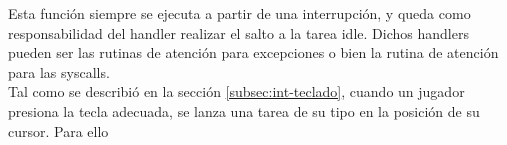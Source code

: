 Esta función siempre se ejecuta a partir de una interrupción, y queda como responsabilidad del handler realizar el salto a la tarea idle. Dichos handlers pueden ser las rutinas de atención para excepciones o bien la rutina de atención para las syscalls.\\



Tal como se describió en la sección \ref{subsec:int-teclado}, cuando un jugador presiona la tecla adecuada, se lanza una tarea de su tipo en la posición de su cursor. 
Para ello 






\begin{comment}
4.7.
Ejercicio 7

a) Construir una función para inicializar las estructuras de datos del scheduler.


b) Crear la función sched proximo indice() que devuelve el ındice en la GDT de la próxima
tarea a ser ejecutada. Construir la rutina de forma devuelva una tarea de cada jugador
por vez según se explica en la sección 3.2

c) Modificar la rutina de la interrupción 0x66, para que implemente los tres servicios según
se indica en la sección 3.1.1.


d) Modificar el código necesario para que se realice el intercambio de tareas por cada ciclo de
reloj. El intercambio se realizará según indique la función sched proximo indice().


e) Modificar las rutinas de excepciones del procesador para que desalojen y destruyan a la
tarea que estaba corriendo y corran la próxima.


f) Implementar el mecanismo de debugging explicado en la sección 3.4 que indicará en pan-
talla la razón del desalojo de una tarea.


Nota: Se recomienda construir funciones en C que ayuden a resolver problemas como
convertir direcciones de el mapa a direcciones fısicas o buscar la proxima tarea a ejecutar.

\end{comment}


\label{sec-desalojo}

